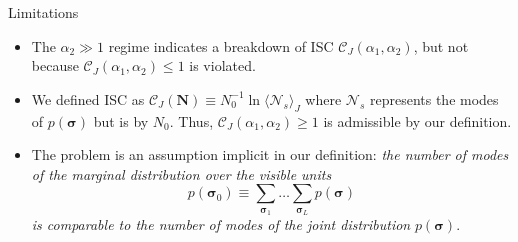 \documentclass[8pt]{beamer}
\begin{document}
\begin{frame}[label={sec:orgd4f1dc5}]{Limitations}
\begin{itemize}
\item The \(\alpha_{2} \gg 1\) regime indicates a breakdown of ISC \(\mathcal{C}_{J} (\alpha_{1}, \alpha_{2})\), but not because \(\mathcal{C}_{J} (\alpha_{1}, \alpha_{2}) \leq 1\) is violated.
\linebreak
\item We defined ISC as \(\mathcal{C}_{J} (\boldsymbol{N}) \equiv N_{0}^{-1} \ln \langle \mathcal{N}_{s} \rangle_{J}\) where \(\mathcal{N}_{s}\) represents the modes of \(p(\boldsymbol{\sigma})\) but is by \(N_{0}\). Thus, \(\mathcal{C}_{J} (\alpha_{1}, \alpha_{2}) \geq 1\) is admissible by our definition.
\linebreak
\item The problem is an assumption implicit in our definition: \emph{the number of modes of the marginal distribution over the visible units} 
\[
p(\boldsymbol{\sigma}_{0}) \equiv \sum_{\boldsymbol{\sigma}_{1}} \ldots \sum_{\boldsymbol{\sigma}_{L}} p (\boldsymbol{\sigma})
\]
\emph{is comparable to the number of modes of the joint distribution} \(p (\boldsymbol{\sigma})\).
\end{itemize}

\end{frame}
\end{document}
